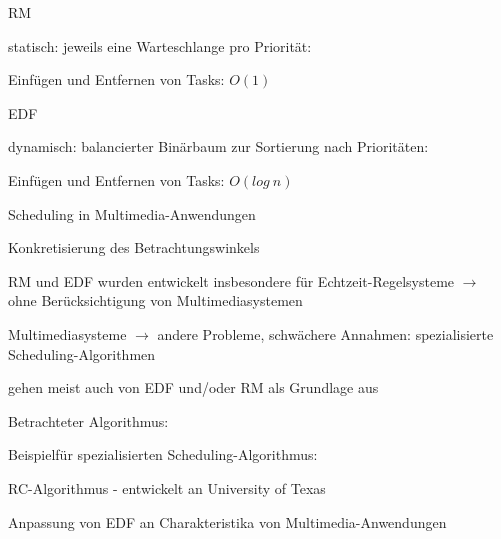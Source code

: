 \documentclass[a4paper]{article}
\begin{document}
\begin{multicols}{3}
    \begin{itemize*}
        \item
        RM
        \begin{itemize*}
            \item statisch: jeweils eine Warteschlange pro Priorität:
            \item Einfügen und Entfernen von Tasks: $O(1)$
        \end{itemize*}
        \item
        EDF
        \begin{itemize*}
            \item dynamisch: balancierter Binärbaum zur Sortierung nach Prioritäten:
            \item Einfügen und Entfernen von Tasks: $O(log\ n)$
        \end{itemize*}
    \end{itemize*}

    Scheduling in Multimedia-Anwendungen

    \begin{itemize*}
        \item
        Konkretisierung des Betrachtungswinkels
        \begin{itemize*}
            \item RM und EDF wurden entwickelt insbesondere für Echtzeit-Regelsysteme $\rightarrow$ ohne Berücksichtigung von Multimediasystemen
            \item Multimediasysteme $\rightarrow$ andere Probleme, schwächere Annahmen: spezialisierte Scheduling-Algorithmen
            \item gehen meist auch von EDF und/oder RM als Grundlage aus
        \end{itemize*}
        \item
        Betrachteter Algorithmus:
        \begin{itemize*}
            \item Beispielfür spezialisierten Scheduling-Algorithmus: \begin{itemize*} \item RC-Algorithmus - entwickelt an University of Texas \item Anpassung von EDF an Charakteristika von Multimedia-Anwendungen \end{itemize*}
        \end{itemize*}
    \end{itemize*}


\end{multicols}
\end{document}
